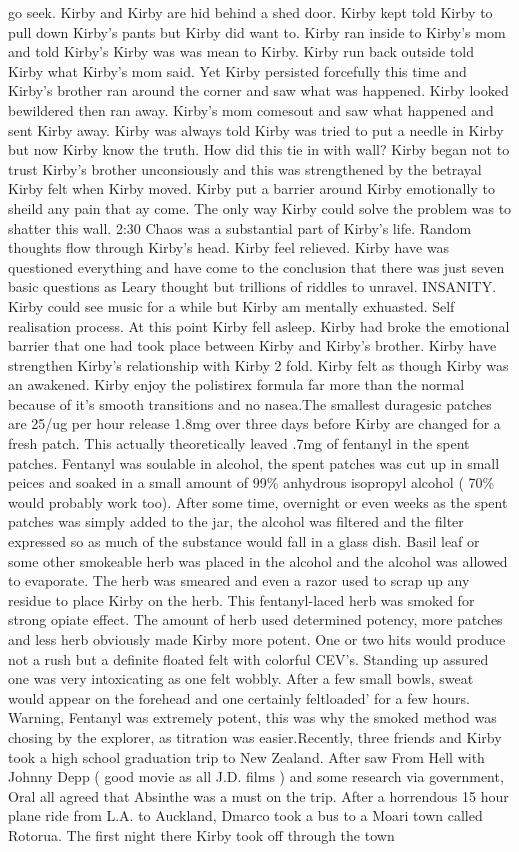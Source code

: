 \documentclass[12pt]{book}
\begin{document}
go seek. Kirby and Kirby are hid behind a shed door. Kirby kept told Kirby to pull down Kirby's pants but Kirby did want to. Kirby ran inside to Kirby's mom and told Kirby's Kirby was was mean to Kirby. Kirby run back outside told Kirby what Kirby's mom said. Yet Kirby persisted forcefully this time and Kirby's brother ran around the corner and saw what was happened. Kirby looked bewildered then ran away. Kirby's mom comesout and saw what happened and sent Kirby away. Kirby was always told Kirby was tried to put a needle in Kirby but now Kirby know the truth. How did this tie in with wall? Kirby began not to trust Kirby's brother unconsiously and this was strengthened by the betrayal Kirby felt when Kirby moved. Kirby put a barrier around Kirby emotionally to sheild any pain that ay come. The only way Kirby could solve the problem was to shatter this wall. 2:30 Chaos was a substantial part of Kirby's life. Random thoughts flow through Kirby's head. Kirby feel relieved. Kirby have was questioned everything and have come to the conclusion that there was just seven basic questions as Leary thought but trillions of riddles to unravel. INSANITY. Kirby could see music for a while but Kirby am mentally exhuasted. Self realisation process. At this point Kirby fell asleep. Kirby had broke the emotional barrier that one had took place between Kirby and Kirby's brother. Kirby have strengthen Kirby's relationship with Kirby 2 fold. Kirby felt as though Kirby was an awakened. Kirby enjoy the polistirex formula far more than the normal because of it's smooth transitions and no nasea.The smallest duragesic patches are 25/ug per hour release 1.8mg over three days before Kirby are changed for a fresh patch. This actually theoretically leaved .7mg of fentanyl in the spent patches. Fentanyl was soulable in alcohol, the spent patches was cut up in small peices and soaked in a small amount of 99\% anhydrous isopropyl alcohol ( 70\% would probably work too). After some time, overnight or even weeks as the spent patches was simply added to the jar, the alcohol was filtered and the filter expressed so as much of the substance would fall in a glass dish. Basil leaf or some other smokeable herb was placed in the alcohol and the alcohol was allowed to evaporate. The herb was smeared and even a razor used to scrap up any residue to place Kirby on the herb. This fentanyl-laced herb was smoked for strong opiate effect. The amount of herb used determined potency, more patches and less herb obviously made Kirby more potent. One or two hits would produce not a rush but a definite floated felt with colorful CEV's. Standing up assured one was very intoxicating as one felt wobbly. After a few small bowls, sweat would appear on the forehead and one certainly feltloaded' for a few hours. Warning, Fentanyl was extremely potent, this was why the smoked method was chosing by the explorer, as titration was easier.Recently, three friends and Kirby took a high school graduation trip to New Zealand. After saw From Hell with Johnny Depp ( good movie as all J.D. films ) and some research via government, Oral all agreed that Absinthe was a must on the trip. After a horrendous 15 hour plane ride from L.A. to Auckland, Dmarco took a bus to a Moari town called Rotorua. The first night there Kirby took off through the town 
\end{document}
